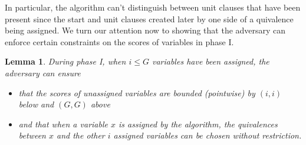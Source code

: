 \documentclass[11pt,letter]{article}
\newtheorem{lemma}[theorem]{Lemma}
\numberwithin{theorem}{section}
\begin{document}
In particular, the algorithm can't distinguish between
unit clauses that have been present since the start
and unit clauses created later by one side of a quivalence being assigned.
We turn our attention now to showing that the adversary
can enforce certain constraints on the scores of variables in phase I.

\begin{lemma}\label{lemma:phaseI}
  During phase I, when $i \leq G$ variables have been assigned,
  the adversary can ensure
  \begin{itemize}
  \item
    that the scores of unassigned variables are bounded (pointwise)
    by $(i,i)$ below and $(G,G)$ above
  \item
    and that when a variable $x$ is assigned by the algorithm,
    the quivalences between $x$ and the other $i$ assigned variables
    can be chosen without restriction.
  \end{itemize}
\end{lemma}
\end{document}
